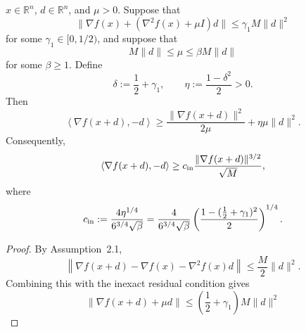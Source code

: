 \begin{itemize}
{\begin{lemma}
                  \(x\in\mathbb R^n\), \(d\in\mathbb R^n\), and \(\mu>0\). Suppose that
                  \[
                      \|\nabla f(x)+(\nabla^2 f(x)+\mu I)d\|
                      \le
                      \gamma_1 M\|d\|^2
                  \]
                  for some \(\gamma_1\in[0,1/2)\), and suppose that
                  \[
                      M\|d\|\le \mu\le \beta M\|d\|
                  \]
                  for some \(\beta\ge1\). Define
                  \[
                      \delta:=\frac12+\gamma_1,
                      \qquad
                      \eta:=\frac{1-\delta^2}{2}>0.
                  \]
                  Then
                  \begin{equation}
                      \label{eq.inexact-inner-product-first}
                      \left\langle \nabla f(x+d),-d\right\rangle
                      \ge
                      \frac{\|\nabla f(x+d)\|^2}{2\mu}
                      +
                      \eta\mu\|d\|^2.
                  \end{equation}
                  Consequently,
                  \begin{equation}
                      \label{eq.inexact-inner-product-advanced}
                      \left\langle \nabla f(x+d),-d\right\rangle
                      \ge
                      c_{\rm in}
                      \frac{\|\nabla f(x+d)\|^{3/2}}{\sqrt M},
                  \end{equation}
                  where
                  \begin{equation}
                      \label{eq.cin-def}
                      c_{\rm in}
                      :=
                      \frac{4\eta^{1/4}}{6^{3/4}\sqrt{\beta}}
                      =
                      \frac{4}{6^{3/4}\sqrt{\beta}}
                      \left(\frac{1-(\frac12+\gamma_1)^2}{2}\right)^{1/4}.
                  \end{equation}
              \end{lemma}
              \begin{proof}
                  By Assumption~2.1,
                  \[
                      \left\|
                      \nabla f(x+d)-\nabla f(x)-\nabla^2 f(x)d
                      \right\|
                      \le
                      \frac{M}{2}\|d\|^2.
                  \]
                  Combining this with the inexact residual condition gives
                  \[
                      \|\nabla f(x+d)+\mu d\|
                      \le
                      \left(\frac12+\gamma_1\right)M\|d\|^2
\]
\end{proof}}
\end{itemize}
